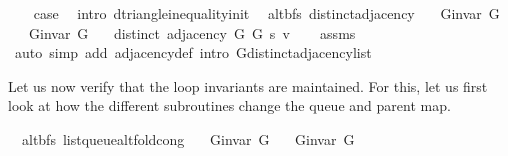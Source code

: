 \begin{isabellebody}
\ \ \isamarkupfalse%
\ {\isacharquery}{\kern0pt}case\ \isamarkupfalse%
\ {\isacharparenleft}{\kern0pt}intro\ d{\isacharunderscore}{\kern0pt}triangle{\isacharunderscore}{\kern0pt}inequality{\isacharunderscore}{\kern0pt}init{\isacharparenright}{\kern0pt}\isanewline
{}\isamarkupfalse%
%
\endisatagproof
{\isafoldproof}%
%
\isadelimproof
\isanewline
%
\endisadelimproof
%
\isadeliminvisible
\isanewline
%
\endisadeliminvisible
%
\isataginvisible
{}\isamarkupfalse%
\ {\isacharparenleft}{\kern0pt}\ alt{\isacharunderscore}{\kern0pt}bfs{\isacharparenright}{\kern0pt}\ distinct{\isacharunderscore}{\kern0pt}adjacency{\isacharcolon}{\kern0pt}\isanewline
\ \ \ {\isachardoublequoteopen}G{\isachardot}{\kern0pt}invar\ G{}{\isachardoublequoteclose}\isanewline
\ \ \ {\isachardoublequoteopen}G{\isachardot}{\kern0pt}invar\ G{}{\isachardoublequoteclose}\isanewline
\ \ \ {\isachardoublequoteopen}distinct\ {\isacharparenleft}{\kern0pt}adjacency\ G{}\ G{}\ s\ v{\isacharparenright}{\kern0pt}{\isachardoublequoteclose}%
\endisataginvisible
{\isafoldinvisible}%
%
\isadeliminvisible
\isanewline
%
\endisadeliminvisible
%
\isadelimproof
\ \ %
\endisadelimproof
%
\isatagproof
{}\isamarkupfalse%
\ assms\isanewline
\ \ \isamarkupfalse%
\ {\isacharparenleft}{\kern0pt}auto\ simp\ add{\isacharcolon}{\kern0pt}\ adjacency{\isacharunderscore}{\kern0pt}def\ intro{\isacharcolon}{\kern0pt}\ G{\isachardot}{\kern0pt}distinct{\isacharunderscore}{\kern0pt}adjacency{\isacharunderscore}{\kern0pt}list{\isacharparenright}{\kern0pt}%
\endisatagproof
{\isafoldproof}%
%
\isadelimproof
%
\endisadelimproof
%
\begin{isamarkuptext}%
Let us now verify that the loop invariants are maintained. For this, let us first look at how the
different subroutines change the queue and parent map.%
\end{isamarkuptext}\isamarkuptrue%
\isamarkupfalse%
\ {\isacharparenleft}{\kern0pt}\ alt{\isacharunderscore}{\kern0pt}bfs{\isacharparenright}{\kern0pt}\ list{\isacharunderscore}{\kern0pt}queue{\isacharunderscore}{\kern0pt}alt{\isacharunderscore}{\kern0pt}fold{\isacharunderscore}{\kern0pt}cong{\isacharcolon}{\kern0pt}\isanewline
\ \ \ {\isachardoublequoteopen}G{\isachardot}{\kern0pt}invar\ G{}{\isachardoublequoteclose}\isanewline
\ \ \ {\isachardoublequoteopen}G{\isachardot}{\kern0pt}invar\ G{}{\isachardoublequoteclose}\isanewline

\end{isabellebody}
